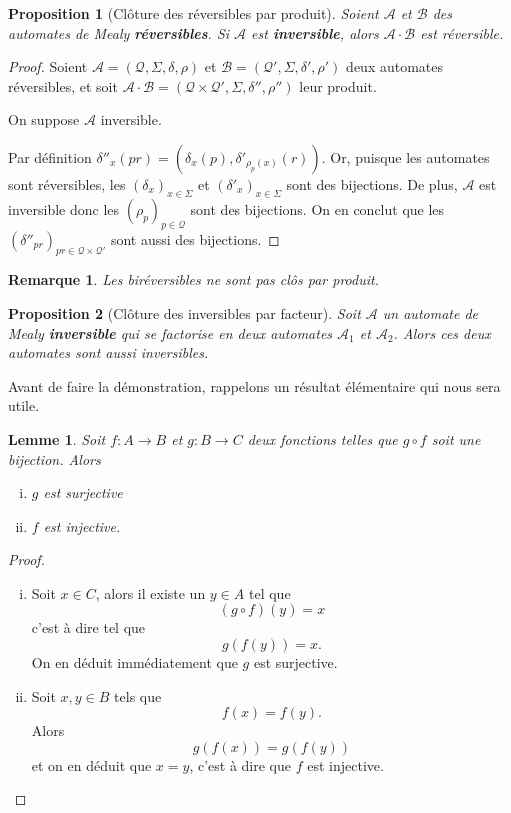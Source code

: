 \documentclass[11pt,a4paper]{article}
\newtheorem{prop}{Proposition}
\newtheorem{lemma}{Lemme}
\newtheorem*{rem*}{Remarque}
\begin{document}
\begin{prop}[Clôture des réversibles par produit]
  Soient $\mathcal{A}$ et $\mathcal{B}$ des automates de Mealy \textbf{réversibles}. Si $\mathcal{A}$ est \textbf{inversible}, alors $\mathcal{A}\cdot\mathcal{B}$ est réversible.
\end{prop}

\begin{proof}
  Soient $\mathcal{A}=\left(\mathcal{Q}, \Sigma, \delta, \rho\right)$ et $\mathcal{B}=\left(\mathcal{Q'}, \Sigma, \delta', \rho'\right)$ deux automates réversibles, et soit $\mathcal{A\cdot B}=\left(\mathcal{Q\times Q'}, \Sigma, \delta'', \rho''\right)$ leur produit.


  On suppose $\mathcal{A}$ inversible.


  Par définition $\delta''_x(pr)=(\delta_x(p), \delta'_{\rho_p(x)}(r))$. Or, puisque les automates sont réversibles, les $(\delta_x)_{x\in\Sigma}$ et ${(\delta'_x)}_{x\in\Sigma}$ sont des bijections. De plus, $\mathcal{A}$ est inversible donc les ${(\rho_p)}_{p\in \mathcal{Q}}$ sont des bijections. On en conclut que les ${(\delta''_{pr})}_{pr\in\mathcal{Q}\times\mathcal{Q'}}$ sont aussi des bijections.
\end{proof}

\begin{rem*}
    Les biréversibles ne sont pas clôs par produit.
\end{rem*}

\begin{prop}[Clôture des inversibles par facteur]\label{prop_cloture_inv_facteurs}
  Soit $\mathcal{A}$ un automate de Mealy \textbf{inversible} qui se factorise en deux automates $\mathcal{A}_1$ et $\mathcal{A}_2$. Alors ces deux automates sont aussi inversibles.
\end{prop}

Avant de faire la démonstration, rappelons un résultat élémentaire qui nous sera utile.
\begin{lemma}\label{lem:bij}
  Soit $f:A\rightarrow B$ et $g:B\rightarrow C$ deux fonctions telles que $g\circ f$ soit une bijection.
  Alors
  \begin{enumerate}[(i)]
  \item $g$ est surjective
  \item $f$ est injective.
  \end{enumerate}
\end{lemma}

\begin{proof}
  \begin{enumerate}[(i)]
  \item Soit $x\in C$, alors il existe un $y\in A$ tel que
    \[ (g\circ f)(y) = x \]
    c'est à dire tel que
    \[ g(f(y)) = x. \]
    On en déduit immédiatement que $g$ est surjective.

  \item Soit $x,y \in B$ tels que \[ f(x) = f(y). \] Alors \[ g(f(x)) = g(f(y)) \] et on en déduit que $x = y$, c'est à dire que $f$ est injective.
  \end{enumerate}
\end{proof}
\end{document}

